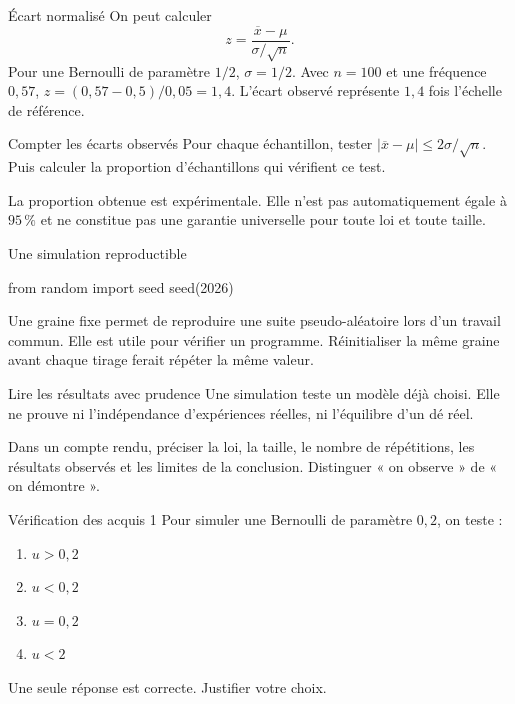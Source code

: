 \documentclass[aspectratio=169,12pt]{beamer}
\begin{document}
\begin{frame}[t,fragile]{Écart normalisé}
On peut calculer\[z=\frac{\overline x-\mu}{\sigma/\sqrt n}.\] Pour une Bernoulli de paramètre $1/2$, $\sigma=1/2$. Avec $n=100$ et une fréquence $0,57$, $z=(0,57-0,5)/0,05=1,4$. L’écart observé représente $1,4$ fois l’échelle de référence.
\end{frame}
\renewcommand{\slidekind}{COMPRENDRE}
\begin{frame}[t,fragile]{Compter les écarts observés}
Pour chaque échantillon, tester $|\overline x-\mu|\le2\sigma/\sqrt n$. Puis calculer la proportion d’échantillons qui vérifient ce test.\medskip\par La proportion obtenue est expérimentale. Elle n’est pas automatiquement égale à $95\,\%$ et ne constitue pas une garantie universelle pour toute loi et toute taille.
\end{frame}
\renewcommand{\slidekind}{COMPRENDRE}
\begin{frame}[t,fragile]{Une simulation reproductible}
\begin{codepython}
from random import seed
seed(2026)
\end{codepython}
Une graine fixe permet de reproduire une suite pseudo-aléatoire lors d’un travail commun. Elle est utile pour vérifier un programme. Réinitialiser la même graine avant chaque tirage ferait répéter la même valeur.
\end{frame}
\renewcommand{\slidekind}{COMPRENDRE}
\begin{frame}[t,fragile]{Lire les résultats avec prudence}
Une simulation teste un modèle déjà choisi. Elle ne prouve ni l’indépendance d’expériences réelles, ni l’équilibre d’un dé réel.\medskip\par Dans un compte rendu, préciser la loi, la taille, le nombre de répétitions, les résultats observés et les limites de la conclusion. Distinguer « on observe » de « on démontre ».
\end{frame}
\renewcommand{\slidekind}{À VOUS DE JOUER}\begin{frame}[t]{Vérification des acquis 1}
Pour simuler une Bernoulli de paramètre $0,2$, on teste :\begin{enumerate}
\item $u>0,2$
\item $u<0,2$
\item $u=0,2$
\item $u<2$
\end{enumerate}\medskip Une seule réponse est correcte. Justifier votre choix.\end{frame}
\end{document}
